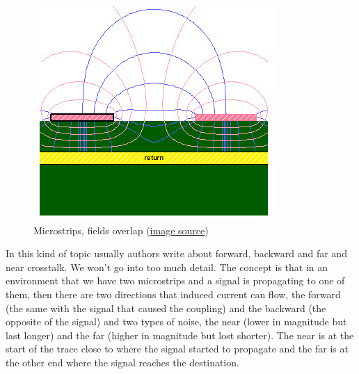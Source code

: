 \documentclass[final]{cubedoc}
\begin{document}
	\begin{figure}[h!]
		\centering
		\includegraphics[keepaspectratio, height=.3\textheight, width = \textwidth]{assets/fringe_fields.png}
		\caption{Microstrips, fields overlap \small{(\href{https://web.archive.org/web/20200814095254/https://www.signalintegrityjournal.com/blogs/4-eric-bogatin-signal-integrity-journal-technical-editor/post/402-pop-quiz-use-tight-or-loosely-coupled-differential-pairs-to-reduce-cross-talk}{image source})}}
	\end{figure}
	
	
	In this kind of topic usually authors write about forward, backward and far and near crosstalk. We won't go into too much detail. The concept is that in an environment that we have two microstrips and a signal is propagating to one of them, then there are two directions that induced current can flow, the forward (the same with the signal that caused the coupling) and the backward (the opposite of the signal) and two types of noise, the near (lower in magnitude but last longer) and the far (higher in magnitude but lost shorter). The near is at the start of the trace close to where the signal started to propagate  and the far is at the other end where the signal reaches the destination.
	
\end{document}
